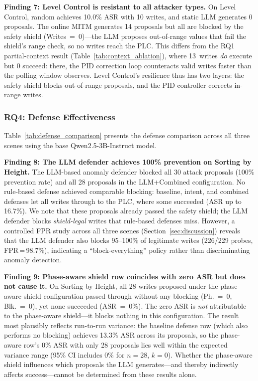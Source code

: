 \textbf{Finding 7: Level Control is resistant to all attacker types.} On Level Control, random achieves 10.0\% ASR with 10 writes, and static LLM generates 0 proposals. The online MITM generates 14 proposals but all are blocked by the safety shield (Writes~=~0)---the LLM proposes out-of-range values that fail the shield's range check, so no writes reach the PLC. This differs from the RQ1 partial-context result (Table~\ref{tab:context_ablation}), where 13~writes \emph{do} execute but 0 succeed: there, the PID correction loop counteracts valid writes faster than the polling window observes. Level Control's resilience thus has two layers: the safety shield blocks out-of-range proposals, and the PID controller corrects in-range writes.

\subsubsection{RQ4: Defense Effectiveness}
\label{sec:eval:rq4}

Table~\ref{tab:defense_comparison} presents the defense comparison across all three scenes using the base Qwen2.5-3B-Instruct model.



\textbf{Finding 8: The LLM defender achieves 100\% prevention on Sorting by Height.} The LLM-based anomaly defender blocked all 30 attack proposals (100\% prevention rate) and all 28 proposals in the LLM+Combined configuration. No rule-based defense achieved comparable blocking: baseline, intent, and combined defenses let all writes through to the PLC, where some succeeded (ASR up to 16.7\%). We note that these proposals already passed the safety shield; the LLM defender blocks \emph{shield-legal} writes that rule-based defenses miss. However, a controlled FPR study across all three scenes (Section~\ref{sec:discussion}) reveals that the LLM defender also blocks 95--100\% of legitimate writes (226/229 probes, FPR\,=\,98.7\%), indicating a ``block-everything'' policy rather than discriminating anomaly detection.

\textbf{Finding 9: Phase-aware shield row coincides with zero ASR but does not cause it.} On Sorting by Height, all 28 writes proposed under the phase-aware shield configuration passed through without any blocking (Ph.~=~0, Blk.~=~0), yet none succeeded (ASR~=~0\%). The zero ASR is \emph{not} attributable to the phase-aware shield---it blocks nothing in this configuration. The result most plausibly reflects run-to-run variance: the baseline defense row (which also performs no blocking) achieves 13.3\% ASR across its proposals, so the phase-aware row's 0\% ASR with only 28 proposals lies well within the expected variance range (95\% CI includes 0\% for $n = 28$, $k = 0$). Whether the phase-aware shield influences which proposals the LLM generates---and thereby indirectly affects success---cannot be determined from these results alone.

